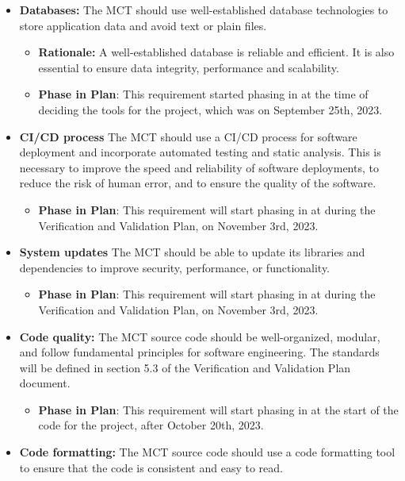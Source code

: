\documentclass[12pt]{article}
\begin{document}
\begin{itemize}
    \item \textbf{Databases: }The MCT should use well-established database technologies to store application data and avoid text or plain files.
    \begin{itemize}
        \item \textbf{Rationale: }A well-established database is reliable and efficient. It is also essential to ensure data integrity, performance and scalability.
        \item \textbf{Phase in Plan}: This requirement started phasing in at the time of deciding the tools for the project, which was on September 25th, 2023.
    \end{itemize}
    \item \textbf{CI/CD process} The MCT should use a CI/CD process for software deployment and incorporate automated testing and static analysis. This is necessary to improve the speed and reliability of software deployments, to reduce the risk of human error, and to ensure the quality of the software.
    \begin{itemize}
        \item \textbf{Phase in Plan}: This requirement will start phasing in at during the Verification and Validation Plan, on November 3rd, 2023.
    \end{itemize}
    \item \textbf{System updates} The MCT should be able to update its libraries and dependencies to improve security, performance, or functionality.
    \begin{itemize}
        \item \textbf{Phase in Plan}: This requirement will start phasing in at during the Verification and Validation Plan, on November 3rd, 2023.
    \end{itemize}
    \item \textbf{Code quality:} The MCT source code should be well-organized, modular, and follow fundamental principles for software engineering. The standards will be defined in section 5.3 of the Verification and Validation Plan document.
    \begin{itemize}
        \item \textbf{Phase in Plan}: This requirement will start phasing in at the start of the code for the project, after October 20th, 2023.
    \end{itemize}
    \item \textbf{Code formatting:} The MCT source code should use a code formatting tool to ensure that the code is consistent and easy to read.

\end{itemize}
\end{document}
